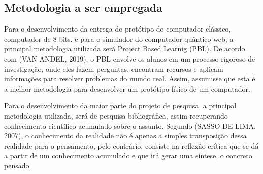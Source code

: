 \begin{samepage}
    \subsection{Metodologia a ser empregada}
    Para o desenvolvimento da entrega do protótipo do computador clássico, computador de 8-bits, e para o simulador do computador quântico web, a principal metodologia utilizada será Project Based Learnig (PBL). De acordo com (VAN ANDEL, 2019), o PBL envolve os alunos em um processo rigoroso de investigação, onde eles fazem perguntas, encontram recursos e aplicam informações para resolver problemas do mundo real. Assim, assumisse que esta é a melhor metodologia para desenvolver um protótipo físico de um computador.\par
	Para o desenvolvimento da maior parte do projeto de pesquisa, a principal metodologia utilizada, será de pesquisa bibliográfica, assim recuperando conhecimento científico acumulado sobre o assunto. Segundo (SASSO DE LIMA, 2007), o conhecimento da realidade não é apenas a simples transposição dessa realidade para o pensamento, pelo contrário, consiste na reflexão crítica que se dá a partir de um conhecimento acumulado e que irá gerar uma síntese, o concreto pensado.

\end{samepage}
\newpage